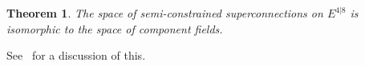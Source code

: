 \documentclass[twoside]{amsart}
\newtheorem{theorem}{Theorem}
\renewcommand{\eqref}[1]{(\ref{eq:#1})}
\renewcommand{\epsilon}{\varepsilon}
\newcommand{\enm}[1]{\ensuremath{#1}}
\newcommand{\superijk}[3]{\enm{{#1}^{#2|#3}}}
\newcommand{\rrij}[2]{\superijk{E}{#1}{#2}}
\newcommand{\evenmi}[1]{\enm{\check{M}^{#1}}}
\newcommand{\diraci}[1]{\enm{{#1}\hskip-.65em /}}
\newcommand{\odiraca}{\diraci{D}}
\renewcommand{\bar}[1]{\overline{#1}}
\newcommand{\cjsup}[2]{\enm{\bar#1{} ^{{\dot{#2 }}}}} %
\newcommand{\cjsub}[2]{\enm{\bar#1{} _{{\dot{#2 }}}}} %
\newcommand{\oqi}[1]{\enm{Q_{#1}}}
\newcommand{\oqicj}[1]{\enm{\cjsub{Q}{#1}}}
\newcommand{\oqa}{\oqi{a}}
\newcommand{\oqacj}{\oqicj{a}}
\newcommand{\even}[3]{\enm{{#1}^{#2 \dot{#3}}}}
\newcommand{\onetwoij}[2]{\enm{#1^{(#2)}}}
\newcommand{\one}[1]{\onetwoij{#1}{1}}
\newcommand{\two}[1]{\onetwoij{#1}{2}}
\newcommand{\dievencov}[2]{\enm{\nabla_{#1\dot{#2}}}}
\newcommand{\eye}{\enm{\sqrt{-1}}}
\newcommand{\sxi}{\enm{\xi}}
\renewcommand{\epsilon}{\varepsilon}
\newcommand{\susols}{\cite{susols}}
\begin{document}
\begin{theorem}
    The space of semi-constrained superconnections on \rrij{4}{8} is
    isomorphic to the space of component fields.
\end{theorem}
See \susols\ for a discussion of this.

\end{document}
